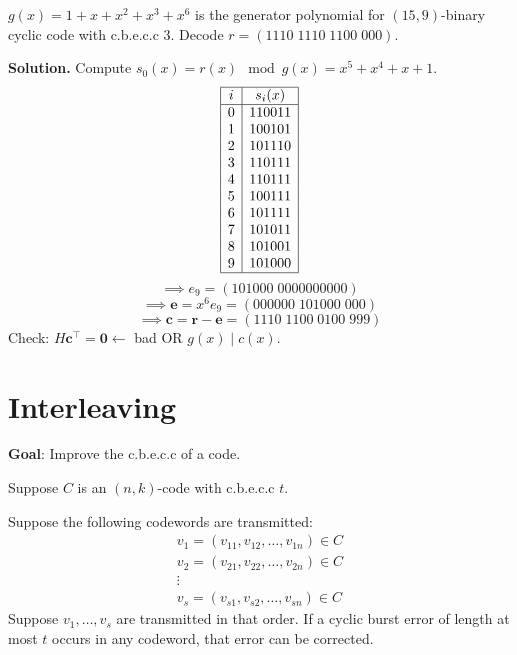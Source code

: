 \begin{exbox}
    \begin{example}
        $ g(x)=1+x+x^2+x^3+x^6 $ is the generator polynomial for $ (15,9) $-binary
        cyclic code with c.b.e.c.c $ 3 $. Decode $ r=(1110\; 1110\; 1100\; 000) $.

        \textbf{Solution.}
        Compute $ s_0(x)=r(x)\mod g(x)=x^5+x^4+x+1 $.
        \[ \begin{array}{|c|c|}
                \hline
                i & s_i(x)\\
                \hline
                0 & 110011 \\
                1 & 100101 \\
                2 & 101110 \\
                3 & 110111 \\
                4 & 110111 \\
                5 & 100111 \\
                6 & 101111 \\
                7 & 101011 \\
                8 & 101001 \\
                9 & 101000 \\
                \hline
            \end{array} \]
            \[ \implies e_9=(101000\; 0000000000) \]
            \[ \implies \bm{e}=x^6 e_9=(000000\; 101000\;000 ) \]
            \[ \implies \bm{c}=\bm{r}-\bm{e}=(1110\;1100\;0100\;999) \]
            Check: $ H\bm{c}^\top=\bm{0} \leftarrow $ bad OR $ g(x)\mid c(x) $.
    \end{example}
\end{exbox}

\section{Interleaving}
\textbf{Goal}: Improve the c.b.e.c.c of a code.

Suppose $ C $ is an $ (n,k) $-code with c.b.e.c.c $ t $.

Suppose the following codewords are transmitted:
\[ \begin{array}{c}
    v_1=(v_{11},v_{12},\ldots ,v_{1n})\in C\\
    v_2=(v_{21},v_{22},\ldots ,v_{2n})\in C\\
    \vdots\\
    v_s=(v_{s1},v_{s2},\ldots ,v_{sn})\in C
\end{array} \]
Suppose $ v_1,\ldots ,v_s $ are transmitted in that order. If a cyclic burst error
of length at most $ t $ occurs in any codeword, that error can be corrected.

